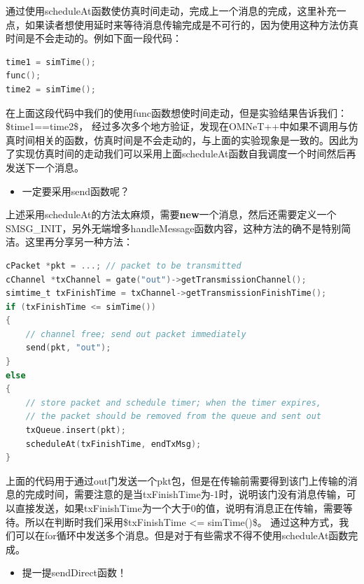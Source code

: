 通过使用scheduleAt函数使仿真时间走动，完成上一个消息的完成，这里补充一点，如果读者想使用延时来等待消息传输完成是不可行的，因为使用这种方法仿真时间是不会走动的。例如下面一段代码：

\begin{lstlisting}[language=c]
time1 = simTime();
func();
time2 = simTime();
\end{lstlisting}

在上面这段代码中我们的使用func函数想使时间走动，但是实验结果告诉我们：
\$time1==time2\$，
经过多次多个地方验证，发现在OMNeT++中如果不调用与仿真时间相关的函数，仿真时间是不会走动的，与上面的实验现象是一致的。因此为了实现仿真时间的走动我们可以采用上面scheduleAt函数自我调度一个时间然后再发送下一个消息。

\begin{itemize}
\item 一定要采用send函数呢？

\end{itemize}

上述采用scheduleAt的方法太麻烦，需要\textbf{new}一个消息，然后还需要定义一个SMSG\_INIT，另外无端增多handleMessage函数内容，这种方法的确不是特别简洁。这里再分享另一种方法：

\begin{lstlisting}[language=c]
cPacket *pkt = ...; // packet to be transmitted
cChannel *txChannel = gate("out")->getTransmissionChannel();
simtime_t txFinishTime = txChannel->getTransmissionFinishTime();
if (txFinishTime <= simTime())
{
    // channel free; send out packet immediately
    send(pkt, "out");
}
else
{
    // store packet and schedule timer; when the timer expires,
    // the packet should be removed from the queue and sent out
    txQueue.insert(pkt);
    scheduleAt(txFinishTime, endTxMsg);
}

\end{lstlisting}

上面的代码用于通过out门发送一个pkt包，但是在传输前需要得到该门上传输的消息的完成时间，需要注意的是当txFinishTime为-1时，说明该门没有消息传输，可以直接发送，如果txFinishTime为一个大于0的值，说明有消息正在传输，需要等待。所以在判断时我们采用\$txFinishTime <= simTime()\$。
通过这种方式，我们可以在for循环中发送多个消息。但是对于有些需求不得不使用scheduleAt函数完成。

\begin{itemize}
\item 提一提sendDirect函数！

\end{itemize}

